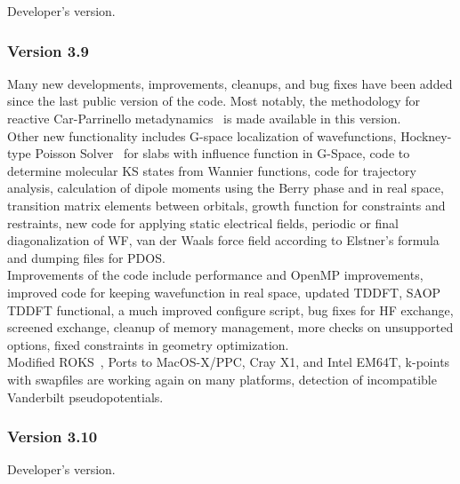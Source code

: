 \documentclass[twoside,10pt,titlepage,a4paper]{article}
\begin{document}
 Developer's version.

\subsubsection{Version 3.9}

  Many new developments, improvements, cleanups, and bug fixes have been added
  since the last public version of the code.
  Most notably, the methodology for reactive
  Car-Parrinello metadynamics~\cite{alaio,iannuzzi}
  is made available in this version.\\
  Other new functionality includes
  G-space localization of wavefunctions,
  Hockney-type Poisson Solver~\cite{Hockney70}
  for slabs with influence function in G-Space,
  code to determine molecular KS states from Wannier functions,
  code for trajectory analysis, calculation of dipole moments using
  the Berry phase and in real space,
  transition matrix elements between orbitals,
  growth function for constraints and restraints,
  new code for applying static electrical fields,
  periodic or final diagonalization of WF, van der Waals force field
  according to Elstner's formula~\cite{Elstner}
  and dumping files for PDOS.\\
  Improvements of the code include
  performance and OpenMP improvements,
  improved code for keeping wavefunction in real space,
  updated TDDFT, SAOP TDDFT functional,
  a much improved configure script,
  bug fixes for HF exchange, screened exchange,
  cleanup of memory management,
  more checks on unsupported options,
  fixed constraints in geometry optimization. \\
  Modified ROKS~\cite{Frank98}, 
  Ports to MacOS-X/PPC, Cray X1, and Intel EM64T,
  k-points with swapfiles are working again on many platforms,
  detection of incompatible Vanderbilt pseudopotentials.
%

\subsubsection{Version 3.10}

  Developer's version.
\end{document}

